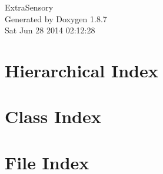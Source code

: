 \documentclass[twoside]{book}
\newcommand{\+}{\discretionary{\mbox{\scriptsize$\hookleftarrow$}}{}{}}
\newcommand{\clearemptydoublepage}{%
  \newpage{\pagestyle{empty}\cleardoublepage}%
}
\begin{document}
\hypersetup{pageanchor=false,
             bookmarks=true,
             bookmarksnumbered=true,
             pdfencoding=unicode
            }
\begin{titlepage}
\vspace*{7cm}
\begin{center}%
{\Large Extra\+Sensory }\\
\vspace*{1cm}
{\large Generated by Doxygen 1.8.7}\\
\vspace*{0.5cm}
{\small Sat Jun 28 2014 02:12:28}\\
\end{center}
\end{titlepage}
\clearemptydoublepage
\tableofcontents
\clearemptydoublepage
{}
\hypersetup{pageanchor=true}

\chapter{Hierarchical Index}

\chapter{Class Index}

\chapter{File Index}

\end{document}
